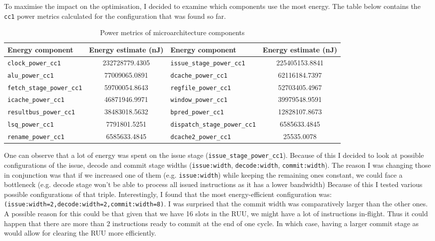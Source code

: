 \documentclass[11pt]{article}
\begin{document}
To maximise the impact on the optimisation, I decided to examine which
components use the most energy. The table below contains the \texttt{cc1} power
metrics calculated for the configuration that was found so far.

\begin{table}[H]
\begin{center}
\begin{tabular}{| l | S[table-format=12.4]| l | S[table-format=12.4]|}
  \hline
  Energy component & {Energy estimate (nJ)} & Energy component & {Energy estimate (nJ)} \\
  \hline
  \texttt{clock\_power\_cc1}   & 232728779.4305 & \texttt{issue\_stage\_power\_cc1}   & 225405153.8841 \\
  \hline
  \texttt{alu\_power\_cc1}   & 77009065.0891 & \texttt{dcache\_power\_cc1}   & 62116184.7397 \\
  \hline
  \texttt{fetch\_stage\_power\_cc1}   & 59700054.8643 & \texttt{regfile\_power\_cc1}   & 52703405.4967 \\
  \hline
  \texttt{icache\_power\_cc1}   & 46871946.9971 & \texttt{window\_power\_cc1}   & 39979548.9591 \\
  \hline
  \texttt{resultbus\_power\_cc1}   & 38483018.5632 & \texttt{bpred\_power\_cc1}   & 12828107.8673 \\
  \hline
  \texttt{lsq\_power\_cc1}   & 7791801.5251 & \texttt{dispatch\_stage\_power\_cc1}   & 6585633.4845 \\
  \hline
  \texttt{rename\_power\_cc1}   & 6585633.4845 & \texttt{dcache2\_power\_cc1}   & 25535.0078 \\
  \hline
\end{tabular}
\end{center}
\caption{Power metrics of microarchitecture components}
\end{table}
\vspace{-2em}

One can observe that a lot of energy was spent on the issue stage
(\texttt{issue\_stage\_power\_cc1}). Because of this I decided to look at
possible configurations of the issue, decode and commit stage widths
(\texttt{issue:width}, \texttt{decode:width}, \texttt{commit:width}). The
reason I was changing those in conjunction was that if we increased one of them
(e.g. \texttt{issue:width}) while keeping the remaining ones constant, we could
face a bottleneck (e.g. decode stage won't be able to process all issued
instructions as it has a lower bandwidth) Because of this I tested various
possible configurations of that triple. Interestingly, I found that the most
energy-efficient configuration was:
\texttt{(issue:width=2,decode:width=2,commit:width=8)}. I was surprised that
the commit width was comparatively larger than the other ones. A possible
reason for this could be that given that we have 16 slots in the RUU, we might
have a lot of instructions in-flight. Thus it could happen that there are more
than 2 instructions ready to commit at the end of one cycle. In which case,
having a larger commit stage as would allow for clearing the RUU more
efficiently.
\end{document}
